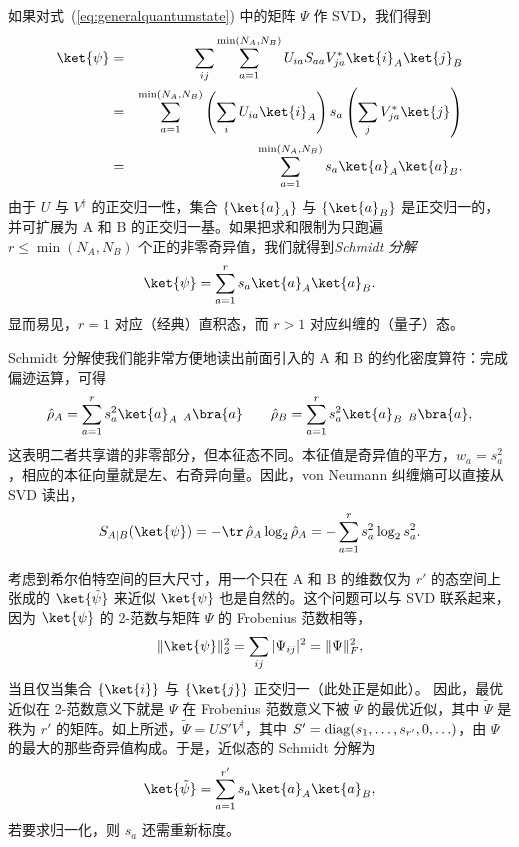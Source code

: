 如果对式~(\ref{eq:generalquantumstate}) 中的矩阵 $\Psi$ 作 SVD，我们得到
\begin{eqnarray}
\ket{\psi} &=& \sum_{ij} \sum_{a=1}^{\min(N_A,N_B)} U_{ia} S_{aa} V^*_{ja} \ket{i}_A \ket{j}_B \nonumber \\
&=& \sum_{a=1}^{\min(N_A,N_B)} \left( \sum_i U_{ia} \ket{i}_A \right) s_a \left( \sum_j V_{ja}^* \ket{j} \right) \nonumber \\
&=& \sum_{a=1}^{\min(N_A,N_B)} s_a \ket{a}_A \ket{a}_B .
\end{eqnarray}
由于 $U$ 与 $V^\dagger$ 的正交归一性，集合 $\{ \ket{a}_A \}$ 与 $\{ \ket{a}_B \}$ 是正交归一的，并可扩展为 A 和 B 的正交归一基。如果把求和限制为只跑遍 $r \leq \min(N_A,N_B)$ 个正的非零奇异值，我们就得到{\em Schmidt 分解}
\begin{equation}
\ket{\psi} = \sum_{a=1}^r s_a \ket{a}_A \ket{a}_B .
\end{equation}
显而易见，$r=1$ 对应（经典）直积态，而 $r>1$ 对应纠缠的（量子）态。

Schmidt 分解使我们能非常方便地读出前面引入的 A 和 B 的约化密度算符：完成偏迹运算，可得
\begin{equation}
\hat{\rho}_A = \sum_{a=1}^r s^2_a \ket{a}_A  \phantom\rangle_A \bra{a} \quad\quad \hat{\rho}_B = \sum_{a=1}^r s^2_a \ket{a}_B \phantom\rangle_B \bra{a} ,
\end{equation}
这表明二者共享谱的非零部分，但本征态不同。本征值是奇异值的平方，$w_a = s^2_a$，相应的本征向量就是左、右奇异向量。因此，von Neumann 纠缠熵可以直接从 SVD 读出，
\begin{equation}
S_{A|B}(\ket{\psi}) = - \tr\, \hat{\rho}_A \log_2 \hat{\rho}_A = - \sum_{a=1}^r s_a^2 \log_2 s_a^2 .
\end{equation}

考虑到希尔伯特空间的巨大尺寸，用一个只在 A 和 B 的维数仅为 $r'$ 的态空间上张成的 $\ket{\tilde{\psi}}$ 来近似 $\ket{\psi}$ 也是自然的。这个问题可以与 SVD 联系起来，因为 $\ket{\psi}$ 的 2-范数与矩阵 $\Psi$ 的 Frobenius 范数相等，
\begin{equation}
\| \ket{\psi} \|_2^2 = \sum_{ij} | \Psi_{ij} |^2 = \| \Psi \|_F^2 ,
\end{equation}
当且仅当集合 $\{ \ket{i} \}$ 与 $\{ \ket{j} \}$ 正交归一（此处正是如此）。
因此，最优近似在 2-范数意义下就是 $\Psi$ 在 Frobenius 范数意义下被 $\tilde{\Psi}$ 的最优近似，其中 $\tilde{\Psi}$ 是秩为 $r'$ 的矩阵。如上所述，$\tilde{\Psi} = US' V^\dagger$，其中 $S'={\rm diag}(s_1, \ldots, s_{r'}, 0, \ldots)$，由 $\Psi$ 的最大的那些奇异值构成。于是，近似态的 Schmidt 分解为
\begin{equation}
\ket{\tilde{\psi}} = \sum_{a=1}^{r'} s_a \ket{a}_A \ket{a}_B ,
\label{eq:Schmidtapproximation}
\end{equation}
若要求归一化，则 $s_a$ 还需重新标度。

